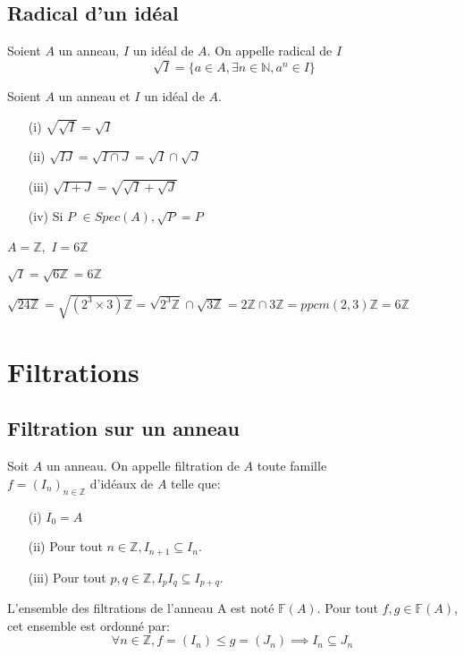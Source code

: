 \subsection{Radical d'un idéal}
\begin{madefinition}
	Soient $A$ un anneau, $I$ un idéal de $A$. On appelle radical de $I$
	\[\sqrt[]{I} = \{ a \in A, \exists n \in \mathbb{N}, a^n \in I \} \]
\end{madefinition}
\begin{maproposition}
	Soient $A$ un anneau et $I$ un idéal de $A$.
	\begin{enumerate}
		\item[(i)] $\sqrt{\sqrt{I}}=\sqrt{I}$
		
		\item[(ii)] $\sqrt{IJ}=\sqrt{I\cap J}=\sqrt{I}\cap \sqrt{J}$
		
		\item[(iii)] $\sqrt{I+J}=\sqrt{\sqrt{I}+\sqrt{J}}$
		
		\item[(iv)] Si $P$ $\in Spec(A),\sqrt{P}=P$
	\end{enumerate}
\end{maproposition}
\begin{monexemple}
	$A=\mathbb{Z},$ $I=6\mathbb{Z}$
	
	$\sqrt{I}=\sqrt{6\mathbb{Z}}=6\mathbb{Z}$
	
	$\sqrt{24\mathbb{Z}}=\sqrt{(2^{3}\times 3)\mathbb{Z}}=\sqrt{2^{3}\mathbb{Z}}\cap \sqrt{3\mathbb{Z}}=2\mathbb{Z}\cap 3\mathbb{Z}=ppcm(2,3)\mathbb{Z}=6\mathbb{Z}$
\end{monexemple}
\section{Filtrations}
\subsection{Filtration sur un anneau}
\begin{madefinition}
	Soit $A$ un anneau. On appelle filtration de $A$ toute famille\\ $f = (I_n)_{n \in \mathbb{Z}}$ d'idéaux de $A$ telle que:\\
	\begin{enumerate}
		\item[(i)] $I_0 = A$ \\
		\item[(ii)] Pour tout $n \in \mathbb{Z}, I_{n+1} \subseteq I_n$.\\
		\item[(iii)] Pour tout $p,q \in \mathbb{Z}, I_pI_q \subseteq I_{p+q}$.\\
	\end{enumerate}
	L'ensemble des filtrations de l'anneau A est noté $\mathbb{F}(A)$. Pour tout $f,g \in \mathbb{F}(A)$, cet ensemble est ordonné par:
	\[\forall n \in \mathbb{Z}, f = (I_n) \leqslant g = (J_n) \implies  I_n \subseteq J_n \]
\end{madefinition}

